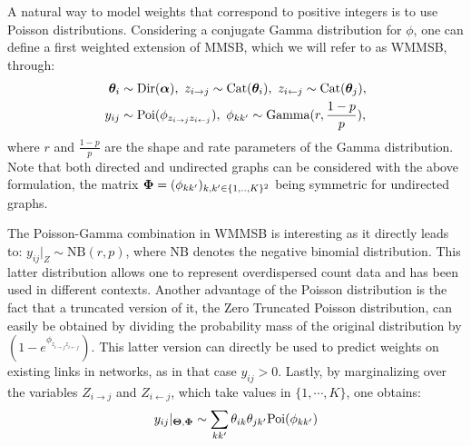 A natural way to model weights that correspond to positive integers is to use Poisson distributions. Considering a conjugate Gamma distribution for $\phi$, one can define a first weighted extension of MMSB, which we will refer to as WMMSB, through:
%
\begin{align*} \label{eq:generative}
\boldsymbol{\theta}_i & \sim \textrm{Dir}(\boldsymbol{\alpha}), \,\, z_{i\rightarrow j} \sim \textrm{Cat}(\boldsymbol{\theta}_i), \,\, z_{i\leftarrow j} \sim \textrm{Cat}(\boldsymbol{\theta}_j), \\
y_{ij} &\sim \textrm{Poi}(\phi_{z_{i \rightarrow j}z_{i \leftarrow j}}), \,\, \phi_{kk'} \sim \textrm{Gamma}(r, \frac{1-p}{p}),
\end{align*}
%
where $r$ and $\frac{1-p}{p}$ are the shape and rate parameters of the Gamma distribution. Note that both directed and undirected graphs can be considered with the above formulation, the matrix $\boldsymbol{\Phi} = (\phi_{kk'})_{k,k' \in \{1,..,K\}^2}$ being symmetric for undirected graphs.

The Poisson-Gamma combination in WMMSB is interesting as it directly leads to: $y_{ij}|_{Z} \sim \textrm{NB}(r,p)$, where $\textrm{NB}$ denotes the negative binomial distribution. This latter distribution allows one to represent overdispersed count data and has been used in different contexts.%
 Another advantage of the Poisson distribution is the fact that a truncated version of it, the Zero Truncated Poisson distribution, can easily be obtained by dividing the probability mass of the original distribution by $(1 - e^{\phi_{z_{i \rightarrow j}z_{i \leftarrow j}}})$. This latter version can directly be used to predict weights on existing links in networks, as in that case $y_{ij} > 0$. Lastly, by marginalizing over the variables $Z_{i \rightarrow j}$ and $Z_{i \leftarrow j}$, which take values in $\{1, \cdots, K\}$, one obtains:
 \begin{equation}\label{eq:PoiCombin}
 y_{ij}|_{\boldsymbol{\Theta},\boldsymbol{\Phi}} \sim \sum_{kk'} \theta_{ik} \theta_{jk'} \textrm{Poi}(\phi_{kk'})
 \end{equation}

